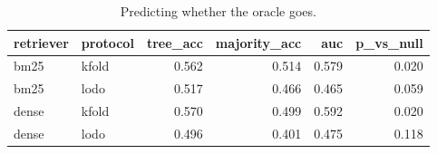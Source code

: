 \begin{table}
\caption{Predicting whether the oracle goes.}
\label{tab:b-go}
\begin{tabular}{llrrrr}
\toprule
retriever & protocol & tree\_acc & majority\_acc & auc & p\_vs\_null \\
\midrule
bm25 & kfold & 0.562 & 0.514 & 0.579 & 0.020 \\
bm25 & lodo & 0.517 & 0.466 & 0.465 & 0.059 \\
dense & kfold & 0.570 & 0.499 & 0.592 & 0.020 \\
dense & lodo & 0.496 & 0.401 & 0.475 & 0.118 \\
\bottomrule
\end{tabular}
\end{table}
